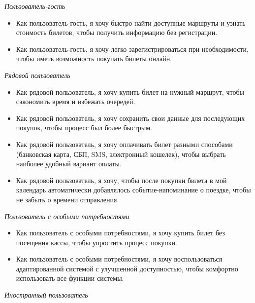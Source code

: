 \begin{center}
    \textit{Пользователь-гость}
\end{center}

\begin{itemize}
    \item Как пользователь-гость, я хочу быстро найти доступные маршруты и узнать стоимость билетов, чтобы получить информацию без регистрации.
    \item Как пользователь-гость, я хочу легко зарегистрироваться при необходимости, чтобы иметь возможность покупать билеты онлайн.
\end{itemize}

\begin{center}
    \textit{Рядовой пользователь}
\end{center}

\begin{itemize}
    \item Как рядовой пользователь, я хочу купить билет на нужный маршрут, чтобы сэкономить время и избежать очередей.
    \item Как рядовой пользователь, я хочу сохранить свои данные для последующих покупок, чтобы процесс был более быстрым.
    \item Как рядовой пользователь, я хочу оплачивать билет разными способами (банковская карта, СБП, SMS, электронный кошелек), чтобы выбрать наиболее удобный вариант оплаты.
    \item Как рядовой пользователь, я хочу, чтобы после покупки билета в мой календарь автоматически добавлялось событие-напоминание о поездке, чтобы не забыть о времени отправления.
\end{itemize}

\begin{center}
    \textit{Пользователь с особыми потребностями}
\end{center}

\begin{itemize}
    \item Как пользователь с особыми потребностями, я хочу купить билет без посещения кассы, чтобы упростить процесс покупки.
    \item Как пользователь с особыми потребностями, я хочу воспользоваться адаптированной системой с улучшенной доступностью, чтобы комфортно использовать все функции системы.
\end{itemize}

\begin{center}
    \textit{Иностранный пользователь}
\end{center}

